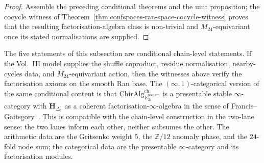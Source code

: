 \begin{proof}
Assemble the preceding conditional theorems and the unit proposition; the
cocycle witness of
Theorem~\ref{thm:confspaces-ran-space-cocycle-witness} proves that
the resulting factorisation-algebra class is non-trivial and
$M_{24}$-equivariant once its stated normalisations are supplied.
\end{proof}

\begin{remark}
\label{rem:confspaces-factorisation-scope}
The five statements of this subsection are conditional chain-level
statements. If the Vol.~III model supplies the shuffle coproduct,
residue normalisation, nearby-cycles data, and $M_{24}$-equivariant
action, then the witnesses above verify the factorisation axioms on the
smooth Ran base. The $(\infty,1)$-categorical version of the same
conditional content is that
$\mathrm{ChirAlg}^{\mathrm{ch}}_{E^{\mathrm{nod,sm}}_{24}}$ is a
presentable stable $\infty$-category with $\mathbf{H}_{\Delta_5}$ as a
coherent factorisation-$\infty$-algebra in the sense of
Francis--Gaitsgory~\cite{FrancisGaitsgory2011}. This is compatible with
the chain-level construction in the two-lane sense: the two lanes inform
each other, neither subsumes the other. The arithmetic data are the
Gritsenko weight $5$, the $\mathbb{Z}/12$ anomaly phase, and the
$24$-fold node sum; the categorical data are the presentable
$\infty$-category and its factorisation modules.
\end{remark}

